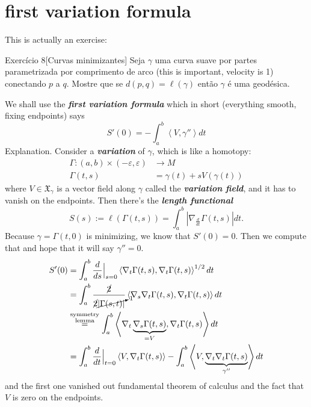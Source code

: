 \section{first variation formula}

This is actually an exercise:

\begin{thing4}{Exercício 8}[Curvas minimizantes]\label{exer:8}\leavevmode
Seja \(\gamma\) uma curva suave por partes parametrizada por comprimento de arco (this is important, velocity is 1) conectando \(p\) a \(q\). Mostre que se \(d(p,q)=\ell(\gamma)\) então \(\gamma\) é uma geodésica.
\end{thing4}

We shall use the \textit{\textbf{first variation formula}} which in short (everything smooth, fixing endpoints) says
\[\boxed{S'(0)=-\int_a^b \left<V,\gamma''\right>dt}\]
Explanation. Consider a \textit{\textbf{variation}} of \(\gamma\), which is like a homotopy:
\begin{align*}
	\Gamma: (a,b)\times(-\varepsilon,\varepsilon) &\longrightarrow M \\
	\Gamma(t,s) &=\gamma(t)+sV(\gamma(t))
\end{align*}
where \(V \in \mathfrak{X}_\gamma\) is a vector field along \(\gamma\) called the \textit{\textbf{variation field}}, and it has to vanish on the endpoints. Then there's the \textit{\textbf{length functional}} 
\[S(s):=\ell(\Gamma(t,s))=\int_a^b|\nabla_{\frac{d}{dt}}\Gamma(t,s)|dt.\]
Because \(\gamma=\Gamma(t,0)\) is minimizing, we know that \(S'(0)=0\). Then we compute that and hope that it will say \(\gamma''=0\).
\begin{align*}
S'(0)&=\int_a^b\frac{d}{ds}\Big|_{s=0}\left<\nabla_t\Gamma(t,s),\nabla_t\Gamma(t,s)\right>^{1/2}dt\\
&=\int_a^b \frac{\cancel{2}}{\cancel{2}\cancelto{1}{\left|\Gamma(s,t)\right|}}\left<\nabla_s \nabla_t\Gamma(t,s),\nabla_t\Gamma(t,s)\right>dt\\
&\overset{\substack{\text{symmetry}  \\ \text{lemma} }}{=}\int_a^b\left<\nabla_t\underbrace{\nabla_s\Gamma(t,s)}_{=V},\nabla_t\Gamma(t,s)\right>dt\\
&=\int_a^b\frac{d}{dt}\Big|_{t=0}\left<V,\nabla_t\Gamma(t,s)\right>-\int_a^b\left<V,\underbrace{\nabla_t\nabla_t\Gamma(t,s)}_{\gamma''}\right>dt
\end{align*}
and the first one vanished out fundamental theorem of calculus and the fact that \(V\) is zero on the endpoints.

